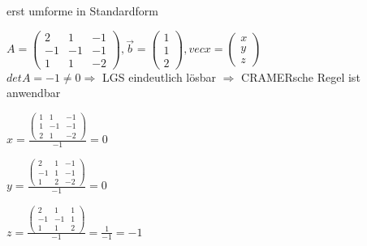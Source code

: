 \documentclass[12pt,a4paper]{scrreprt}
\begin{document}
\begin{enumerate}
erst umforme in Standardform

$
A=\begin{pmatrix}2 & 1 & -1 \\
-1 & -1 & -1 \\
1 & 1 & -2
\end{pmatrix}, \vec{b} = \begin{pmatrix} 1 \\ 1 \\ 2 \end{pmatrix}, vec{x} = \begin{pmatrix} x \\ y \\ z \end{pmatrix}$ \\
$det A = -1 \neq 0 \Rightarrow$ LGS eindeutlich lösbar $\Rightarrow$ CRAMERsche Regel ist anwendbar 

$x = \frac{\begin{pmatrix}
1 & 1 & -1 \\
1 & -1 & -1 \\
2 & 1 & -2
\end{pmatrix}}{-1} = 0$

$
y = \frac{\begin{pmatrix}
2  & 1 &  -1 \\
-1 & 1 & -1 \\
1  & 2 &  -2
\end{pmatrix}}{-1} = 0$

$z = \frac{\begin{pmatrix}
2 & 1 & 1 \\
-1 & -1 & 1 \\
1 & 1 & 2
\end{pmatrix}}{-1} = \frac{1}{-1} = -1$



%
%
%

\end{enumerate}
\end{document}
